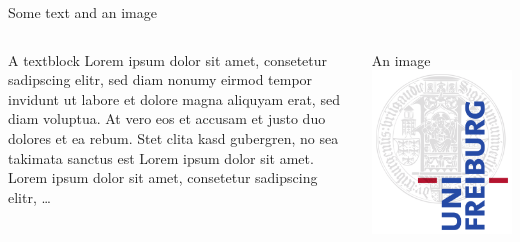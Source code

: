 \begin{frame}{Some text and an image}
\begin{columns}[T]
    \begin{column}{.5\textwidth}
     \begin{block}{A textblock}
		Lorem ipsum dolor sit amet, consetetur sadipscing elitr, sed diam nonumy eirmod tempor invidunt ut labore et dolore magna aliquyam erat, sed diam voluptua. At vero eos et accusam et justo duo dolores et ea rebum. Stet clita kasd gubergren, no sea takimata sanctus est Lorem ipsum dolor sit amet. Lorem ipsum dolor sit amet, consetetur sadipscing elitr, \dots
    \end{block}
    \end{column}
    \begin{column}{.5\textwidth}
    \begin{block}{An image}
    \includegraphics[width=\textwidth]{img/Logo1000px.png}
    \end{block}
    \end{column}
  \end{columns}
\end{frame}

